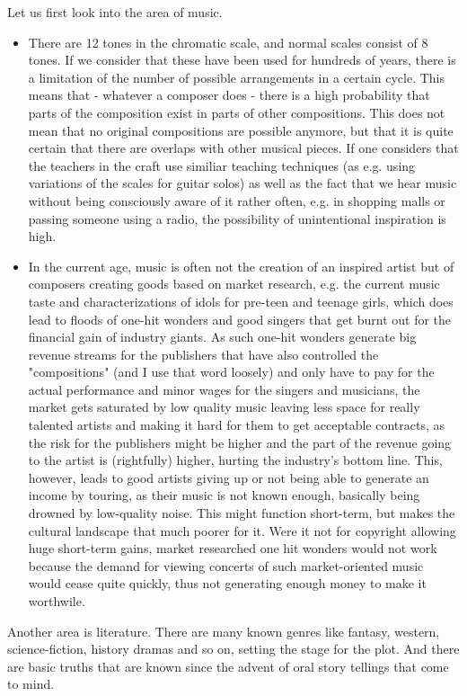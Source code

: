 \documentclass[a4paper]{report}
\begin{document}
Let us first look into the area of music.
\begin{itemize}
	\item There are 12 tones in the chromatic scale, and normal scales consist of 8 tones. If we consider that these have been used for hundreds of years, there is a limitation of the number of possible arrangements in a certain cycle. This means that - whatever a composer does - there is a high probability that parts of the composition exist in parts of other compositions. This does not mean that no original compositions are possible anymore, but that it is quite certain that there are overlaps with other musical pieces. If one considers that the teachers in the craft use similiar teaching techniques (as e.g. using variations of the scales for guitar solos) as well as the fact that we hear music without being consciously aware of it rather often, e.g. in shopping malls or passing someone using a radio, the possibility of unintentional inspiration is high. 
	\item In the current age, music is often not the creation of an inspired artist but of composers creating goods based on market research, e.g. the current music taste and characterizations of idols for pre-teen and teenage girls, which does lead to floods of one-hit wonders and good singers that get burnt out for the financial gain of industry giants. As such one-hit wonders generate big revenue streams for the publishers that have also controlled the "compositions" (and I use that word loosely) and only have to pay for the actual performance and minor wages for the singers and musicians, the market gets saturated by low quality music leaving less space for really talented artists and making it hard for them to get acceptable contracts, as the risk for the publishers might be higher and the part of the revenue going to the artist is (rightfully) higher, hurting the industry's bottom line. This, however, leads to good artists giving up or not being able to generate an income by touring, as their music is not known enough, basically being drowned by low-quality noise. This might function short-term, but makes the cultural landscape that much poorer for it. Were it not for copyright allowing huge short-term gains, market researched one hit wonders would not work because the demand for viewing concerts of such market-oriented music would cease quite quickly, thus not generating enough money to make it worthwile.
\end{itemize}
Another area is literature. There are many known genres like fantasy, western, science-fiction, history dramas and so on, setting the stage for the plot. And there are basic truths that are known since the advent of oral story tellings that come to mind.
\end{document}

